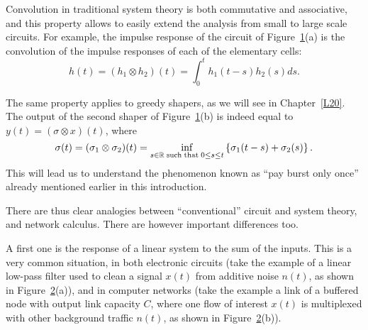 Convolution in traditional system theory is both commutative and
associative, and this property allows to easily extend the
analysis from small to large scale circuits. For example, the
impulse response of the circuit of
Figure~\ref{fig:compositionlinear}(a) is the convolution of the
impulse responses of each of the elementary cells:
$$ h(t) = (h_1 \otimes h_2)(t) = \int_{0}^{t} h_1(t-s)h_2(s) ds.  $$

The same property applies to greedy shapers, as we will see in
Chapter~\ref{L20}. The output of the second shaper of
Figure~\ref{fig:compositionlinear}(b) is indeed equal to $y(t) =
(\sigma \otimes x)(t)$, where
$$\sigma(t) =  (\sigma_1 \otimes \sigma_2)(t) = \inf_{s \in \mathbb{R} \mathrm{\; such \; that \; } 0 \leq s \leq t} \left\{ \sigma_1(t-s) + \sigma_2(s) \right\}. $$
This will lead us to understand the phenomenon known as ``pay
burst only once'' already mentioned earlier in this introduction.


\begin{figure}[!h]
 
\protect\label{fig:compositionlinear}
\end{figure}


There are thus clear analogies between ``conventional'' circuit
and system theory, and network calculus. There are however
important differences too.

A first one is the response of a linear system to the sum of the
inputs. This is a very common situation, in both electronic
circuits (take the example of a linear low-pass filter used to
clean a signal $x(t)$ from additive noise $n(t)$, as shown in
Figure~\ref{fig:linear-response}(a)), and in computer networks
(take the example a link of a buffered node with output link
capacity $C$, where one flow of interest $x(t)$ is multiplexed
with other background traffic $n(t)$, as shown in
Figure~\ref{fig:linear-response}(b)).

\begin{figure}[!h]
 
\protect\label{fig:linear-response}
\end{figure}

